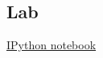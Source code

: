 \begin{comment}
4. Since each row in $M$ is a rotation of $S$, the character $L[i]$ cyclicly precedes the character $F[i]$ in $S$.
    ```
    L[0] = "c" precedes F[0] = "a" in S = "abraca"
    ```
   If we take $i=T[j]$, $L[T[j]]$ cyclicly precedes $F[T[j]]=L[j]$ in $S$. Sumarizing:
   <br/>
   <br/>
   $$
   L[T[j]]~\text{cyclicly precedes}~L[j]~\text{in}~S,~\text{for}~j~\text{in}~\text{range}(n).
   $$
   <br/>
   Remember, the index $I$ is defined such that row $I$ of $M$ is $S$. Thus, the last character of $S$ is $L[I]$.
   ```
   S[n-1] = "a" = L[1]
   ```
   We can use the vector T to give the predecessors of each character, by defining:
   <br/>
   <br/>
   $$
   S[n-1-i] = L[T^i[I]], ~\text{for}~i~\text{in}~\text{range}(n)
   $$
   <br/>
   where $T^0[x]=x$ and $T^{i+1}[x] = T[T^i[x]]$. This is equivalent to reconstruct the reverse of $S$,
   traveling $L$ as defined by `Tx`:
   ```
   Tx = [I]
   for i in range(1, n):
        Tx.append(T[Tx[i-1]])
   ```
   This computes:
   ```
   Tx[0] = 1                            T  = [4, 0, 5, 1, 2, 3]
   Tx[1] = T[Tx[0]] = T[1] = 0          Tx = [1, 0, 4, 2, 5, 3]
   Tx[2] = T[Tx[1]] = T[0] = 4                0  1  2  3  4  5
   Tx[3] = T[Tx[2]] = T[4] = 2
   Tx[4] = T[Tx[3]] = T[2] = 5
   Tx[5] = T[Tx[4]] = T[5] = 3
   ```
   Finally:
   ```
   Reversed S = L[1], L[0], L[4], L[2], L[5], L[3] = a, c, a, r, b, a
                                                 S = a, b, r, a, c, a
   ```
\end{comment}

\subsection{Lab}
\href{https://nbviewer.jupyter.org/github/vicente-gonzalez-ruiz/Burrows-Wheeler_transform/blob/master/BWT.ipynb}{IPython notebook}
